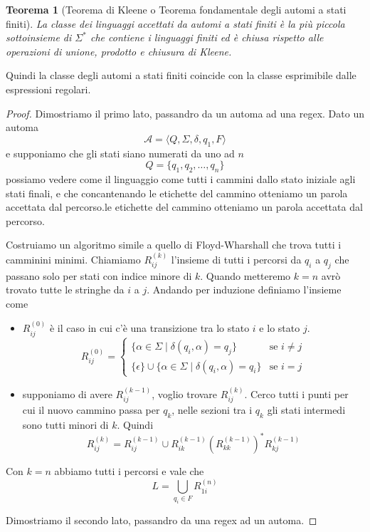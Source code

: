 \documentclass[12pt]{report}
\newtheorem{teorema}{Teorema}
\begin{document}
\begin{teorema}[Teorema di Kleene o Teorema fondamentale degli automi a stati finiti]
	La classe dei linguaggi accettati da automi a stati finiti è la più piccola sottoinsieme di $\Sigma^*$ che contiene i linguaggi finiti ed è chiusa rispetto alle operazioni di unione, prodotto e chiusura di Kleene.
\end{teorema}
Quindi la classe degli automi a stati finiti coincide con la classe esprimibile dalle espressioni regolari.
\begin{proof}
	Dimostriamo il primo lato, passandro da un automa ad una regex.
	Dato un automa
	$$ \mathcal{A} = \langle Q, \Sigma, \delta, q_1, F \rangle$$
	e supponiamo che gli stati siano numerati da uno ad $n$
	$$ Q = \{ q_1, q_2, \dots, q_n \} $$
	possiamo vedere come il linguaggio come tutti i cammini dallo stato iniziale agli stati finali, e che concantenando le etichette del cammino otteniamo un parola accettata dal percorso.le etichette del cammino otteniamo un parola accettata dal percorso.


	Costruiamo un algoritmo simile a quello di Floyd-Wharshall che trova tutti i camminini minimi.
	Chiamiamo $R_{ij}^{(k)}$ l'insieme di tutti i percorsi da $q_i$ a $q_j$ che passano solo per stati con indice minore di $k$.
	Quando metteremo $k = n$ avrò trovato tutte le stringhe da $i$ a $j$.
	Andando per induzione definiamo l'insieme come
	\begin{itemize}
		\item $R_{ij}^{(0)}$ è il caso in cui c'è una transizione tra lo stato $i$ e lo stato $j$.
			$$ R_{ij}^{(0)} = 
			\begin{cases}
				\{ \alpha \in \Sigma \mid \delta(q_i, \alpha) = q_j \} & \text{se } i \neq j \\
				\{\epsilon\} \cup \{ \alpha \in \Sigma \mid \delta(q_i, \alpha) = q_i \} & \text{se } i = j 
			\end{cases}
			$$
		\item supponiamo di avere $R_{ij}^{(k - 1)}$, voglio trovare $R_{ij}^{(k)}$.
			Cerco tutti i punti per cui il nuovo cammino passa per $q_k$, nelle sezioni tra i $q_k$ gli stati intermedi sono tutti minori di $k$.
			Quindi 
			$$ R_{ij}^{(k)} = R_{ij}^{(k - 1)} \cup R_{ik}^{(k - 1)} \left (R_{kk}^{(k - 1)}\right )^* R_{kj}^{(k - 1)} $$
	\end{itemize}
	Con $k = n$ abbiamo tutti i percorsi e vale che
	$$ L = \bigcup_{q_i \in F} R_{1i}^{(n)} $$

	Dimostriamo il secondo lato, passandro da una regex ad un automa.
\end{proof}
\end{document}
